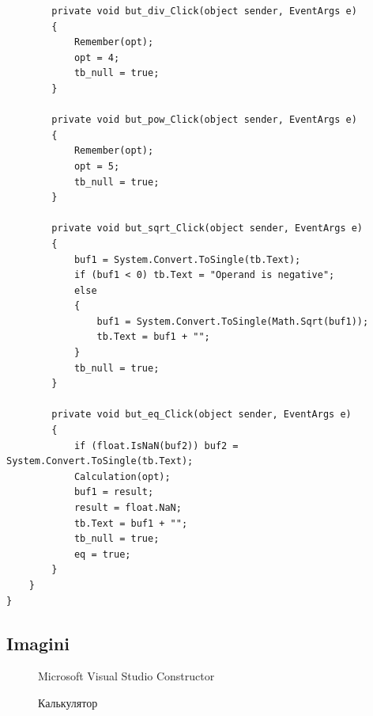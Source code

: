 \begin{verbatim}
		private void but_div_Click(object sender, EventArgs e)
		{
			Remember(opt);
			opt = 4;
			tb_null = true;
		}
		
		private void but_pow_Click(object sender, EventArgs e)
		{
			Remember(opt);
			opt = 5;
			tb_null = true;
		}
		
		private void but_sqrt_Click(object sender, EventArgs e)
		{
			buf1 = System.Convert.ToSingle(tb.Text);
			if (buf1 < 0) tb.Text = "Operand is negative";
			else
			{
				buf1 = System.Convert.ToSingle(Math.Sqrt(buf1));
				tb.Text = buf1 + "";
			}
			tb_null = true;
		}
		
		private void but_eq_Click(object sender, EventArgs e)
		{
			if (float.IsNaN(buf2)) buf2 = System.Convert.ToSingle(tb.Text);
			Calculation(opt);
			buf1 = result;
			result = float.NaN;
			tb.Text = buf1 + "";
			tb_null = true;
			eq = true;
		}
	}
}
\end{verbatim}


\subsection{Imagini}

\begin{figure}[h]
	\caption{Microsoft Visual Studio Constructor}
	\label{ris:image}
\end{figure}
\hfill
\begin{figure}[h]
	\caption{Калькулятор}
	\label{ris:image}
\end{figure}

\clearpage